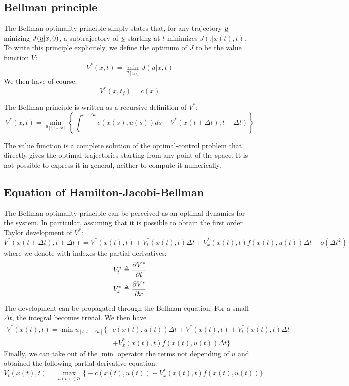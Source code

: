 \documentclass{book}
\begin{document}
\subsection{Bellman principle}

The Bellman optimality principle simply states that, for any trajectory $\underline{u}$ minizing $J(\underline{u}|x,0)$, a subtrajectory of $\underline{u}$ starting at $t$ minimizes $J(.|x(t),t)$. To write this principle explicitely, we define the optimum of $J$ to be the value function $V$:
$$V^*(x,t) = \min_{u_{[t,t_f]}} J(u|x,t)$$
We then have of course:
$$ V^*(x,t_f) = c(x)$$

The Bellman principle is written as a recursive definition of $V^*$:
$$V^*(x,t) = \min_{u_{[t,t+\Delta t]}} \left\{ \int_t^{t+\Delta t} c(x(s),u(s)) ds + V^*(x(t+\Delta t),t+\Delta t) \right\}$$

The value function is a complete solution of the optimal-control problem that directly gives the optimal trajectories starting from any point of the space. It is not possible to express it in general, neither to compute it numerically.



\subsection{Equation of Hamilton-Jacobi-Bellman}

The Bellman optimality principle can be perceived as an optimal dynamics for the system. In particular, assuming that it is possible to obtain the first order Taylor development of $V^*$:
$$V^*(x(t+\Delta t),t+\Delta t) = V^*(x(t),t) + V_t^*(x(t),t) \Delta t + V_x^*(x(t),t) f(x(t),u(t)) \Delta t + o(\Delta t^2)$$
where we denote with indexes the partial derivatives:
$$ V_t^* \triangleq \frac{\partial{V^*}}{\partial{t}} $$
$$ V_x^* \triangleq \frac{\partial{V^*}}{\partial{x}} $$

The development can be propagated through the Bellman equation. For a small $\Delta t$, the integral becomes trivial. We then have
\begin{align*}
 V^*(x(t),t) = \min{ u_{[t,t+\Delta t]}} \Big\{ & c(x(t),u(t)) \Delta t + V^*(x(t),t) + 
V_t^*(x(t),t) \Delta t \\ &+ V_x^*(x(t),t) f(x(t),u(t)) \Delta t \Big\}
\end{align*}
Finally, we can take out of the $\min$ operator the terms not depending of $u$ and obtained the following partial derivative equation:
$$ V_t(x(t),t) = \max_{u(t) \in \mathcal{U}} \Big\{ - c(x(t),u(t))  - V_x^*(x(t),t) f(x(t),u(t)) \Big\} $$
\end{document}
